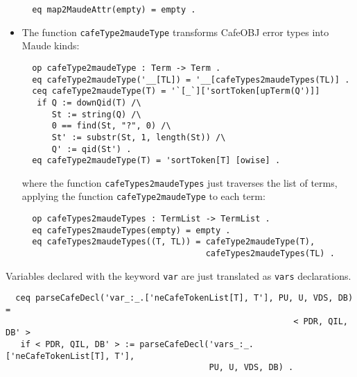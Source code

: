 \begin{itemize}
{\codesize
\begin{verbatim}
  eq map2MaudeAttr(empty) = empty .
\end{verbatim}
}

\item
The function \verb"cafeType2maudeType" transforms CafeOBJ error types into
Maude kinds:

{\codesize
\begin{verbatim}
  op cafeType2maudeType : Term -> Term .
  eq cafeType2maudeType('__[TL]) = '__[cafeTypes2maudeTypes(TL)] .
  ceq cafeType2maudeType(T) = '`[_`]['sortToken[upTerm(Q')]]
   if Q := downQid(T) /\
      St := string(Q) /\
      0 == find(St, "?", 0) /\
      St' := substr(St, 1, length(St)) /\
      Q' := qid(St') .
  eq cafeType2maudeType(T) = 'sortToken[T] [owise] .
\end{verbatim}
}

\noindent
where the function \verb"cafeTypes2maudeTypes" just traverses the list
of terms, applying the function \texttt{cafeType2maudeType} to each term:

{\codesize
\begin{verbatim}
  op cafeTypes2maudeTypes : TermList -> TermList .
  eq cafeTypes2maudeTypes(empty) = empty .
  eq cafeTypes2maudeTypes((T, TL)) = cafeType2maudeType(T),
                                     cafeTypes2maudeTypes(TL) .
\end{verbatim}
}

\end{itemize}

{\codesize
\begin{comment}
  op parseHiddenSort : Term ~> Sort .
  eq parseHiddenSort('CafeToken[T]) =
     if downQid(T) :: Type
     then downQid(T)
     else qidError('\y 'Warning: '\o downQid(T) 'is 'not 'a 'valid 'sort. '\n)
     fi .
  eq parseHiddenSort(T) = qidError('\y 'Warning: '\o 'invalid 'sort. '\n) [owise] .
\end{comment}
}

Variables declared with the keyword \verb"var" are just translated as \verb"vars"
declarations.

{\codesize
\begin{verbatim}
  ceq parseCafeDecl('var_:_.['neCafeTokenList[T], T'], PU, U, VDS, DB) =
                                                          < PDR, QIL, DB' >
   if < PDR, QIL, DB' > := parseCafeDecl('vars_:_.['neCafeTokenList[T], T'],
                                         PU, U, VDS, DB) .
\end{verbatim}
}

